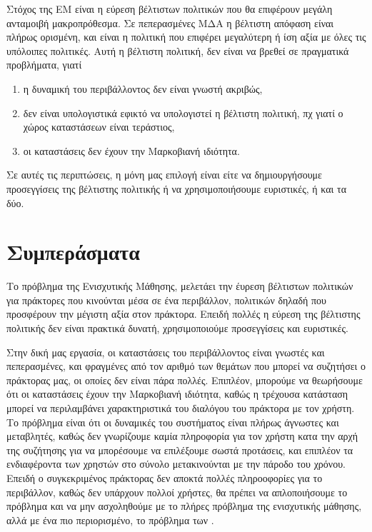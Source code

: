 Στόχος της ΕΜ είναι η εύρεση βέλτιστων πολιτικών που θα επιφέρουν μεγάλη ανταμοιβή μακροπρόθεσμα. Σε πεπερασμένες ΜΔΑ η βέλτιστη απόφαση είναι πλήρως ορισμένη, και είναι η πολιτική που επιφέρει μεγαλύτερη ή ίση αξία με όλες τις υπόλοιπες πολιτικές. Αυτή η βέλτιστη πολιτική, δεν είναι να βρεθεί σε πραγματικά προβλήματα, γιατί
\begin{enumerate}
    \item η δυναμική του περιβάλλοντος δεν είναι γνωστή ακριβώς,
    \item δεν είναι υπολογιστικά εφικτό να υπολογιστεί η βέλτιστη πολιτική, πχ γιατί ο χώρος καταστάσεων είναι τεράστιος,
    \item οι καταστάσεις δεν έχουν την Μαρκοβιανή ιδιότητα.
\end{enumerate}

Σε αυτές τις περιπτώσεις, η μόνη μας επιλογή είναι είτε να δημιουργήσουμε προσεγγίσεις της βέλτιστης πολιτικής ή να χρησιμοποιήσουμε ευριστικές, ή και τα δύο.

\section{Συμπεράσματα}

Το πρόβλημα της Ενισχυτικής Μάθησης, μελετάει την έυρεση βέλτιστων πολιτικών για πράκτορες που κινούνται μέσα σε ένα περιβάλλον, πολιτικών δηλαδή που προσφέρουν την μέγιστη αξία στον πράκτορα. Επειδή πολλές η εύρεση της βέλτιστης πολιτικής δεν είναι πρακτικά δυνατή, χρησιμοποιούμε προσεγγίσεις και ευριστικές.

Στην δική μας εργασία, οι καταστάσεις του περιβάλλοντος είναι γνωστές και πεπερασμένες, και φραγμένες από τον αριθμό των θεμάτων που μπορεί να συζητήσει ο πράκτορας μας, οι οποίες δεν είναι πάρα πολλές. Επιπλέον, μπορούμε να θεωρήσουμε ότι οι καταστάσεις έχουν την Μαρκοβιανή ιδιότητα, καθώς η τρέχουσα κατάσταση μπορεί να περιλαμβάνει χαρακτηριστικά του διαλόγου του πράκτορα με τον χρήστη. Το πρόβλημα είναι ότι οι δυναμικές του συστήματος είναι πλήρως άγνωστες και μεταβλητές, καθώς δεν γνωρίζουμε καμία πληροφορία για τον χρήστη κατα την αρχή της συζήτησης για να μπορέσουμε να επιλέξουμε σωστά προτάσεις, και επιπλέον τα ενδιαφέροντα των χρηστών στο σύνολο μετακινούνται με την πάροδο του χρόνου. Επειδή ο συγκεκριμένος πράκτορας δεν αποκτά πολλές πληροοφορίες για το περιβάλλον, καθώς δεν υπάρχουν πολλοί χρήστες, θα πρέπει να απλοποιήσουμε το πρόβλημα και να μην ασχοληθούμε με το πλήρες πρόβλημα της ενισχυτικής μάθησης, αλλά με ένα πιο περιορισμένο, το πρόβλημα των .
